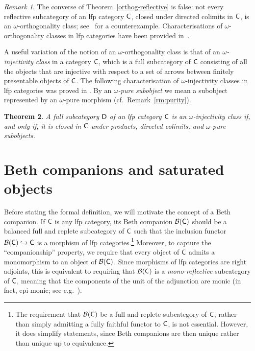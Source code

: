 \documentclass[a4paper,10pt,reqno]{amsart}
\newtheorem{theorem}{Theorem}[section]
\theoremstyle{definition}
\theoremstyle{remark}
\newtheorem{remark}[theorem]{Remark}
\newcommand{\cat}{{\sf C}}								%
\newcommand{\catt}{{\sf D}}								%
\newcommand{\B}[1]{\mathcal{B}(#1)}						%
\newcommand{\into}{\hookrightarrow}						%
\begin{document}
\begin{remark}
The converse of Theorem~\ref{orthog-reflective} is false: not every reflective subcategory of an lfp category $\cat$, closed under directed colimits in $\cat$, is an $\omega$-orthogonality class; see~\cite{Volger1979} for a counterexample. Characterisations of $\omega$-orthogonality classes in lfp categories have been provided in~\cite{HAR2001,AS2004}.
\end{remark}

A useful variation of the notion of an $\omega$-orthogonality class is that of an \emph{$\omega$-injectivity class} in a category $\cat$, which is a full subcategory of $\cat$ consisting of all the objects that are injective with respect to a set of arrows between finitely presentable objects of $\cat$.
The following characterisation of $\omega$-injectivity classes in lfp categories was proved in \cite[Theorem~2.2]{RAB2022}. By an \emph{$\omega$-pure subobject} we mean a subobject represented by an $\omega$-pure morphism (cf.\ Remark~\ref{rm:purity}).

\begin{theorem}\label{t:charact-inj-classes}
A full subcategory $\catt$ of an lfp category $\cat$ is an $\omega$-injectivity class if, and only if, it is closed in $\cat$ under products, directed colimits, and $\omega$-pure subobjects.
\end{theorem}


\section{Beth companions and saturated objects}\label{s:Beth-saturated}

Before stating the formal definition, we will motivate the concept of a Beth companion. If $\cat$ is any lfp category, its Beth companion $\B{\cat}$ should be a balanced full and replete subcategory of $\cat$ such that the inclusion functor $\B{\cat}\into \cat$ is a morphism of lfp categories.\footnote{The requirement that $\B{\cat}$ be a full and replete subcategory of $\cat$, rather than simply admitting a fully faithful functor to $\cat$, is not essential. However, it does simplify statements, since Beth companions are then unique rather than unique up to equivalence.} Moreover, to capture the ``companionship'' property, we require that every object of $\cat$ admits a monomorphism to an object of $\B{\cat}$. Since morphisms of lfp categories are right adjoints, this is equivalent to requiring that $\B{\cat}$ is a \emph{mono-reflective} subcategory of $\cat$, meaning that the components of the unit of the adjunction are monic (in fact, epi-monic; see e.g.\ \cite[Proposition~16.3]{ahs06book}). 
\end{document}
